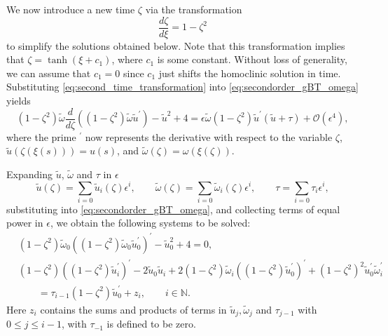 We now introduce a new time $\zeta$ via the transformation
\begin{equation}
  \label{eq:second_time_transformation}
  \frac{d\zeta}{d\xi} = 1 - \zeta^2
\end{equation}
to simplify the solutions obtained below. Note that this transformation implies
that $\zeta = \tanh(\xi + c_1)$, where $c_1$ is some constant. Without loss of
generality, we can assume that $c_1=0$ since $c_1$ just shifts the homoclinic
solution in time. Substituting \cref{eq:second_time_transformation} into
\cref{eq:secondorder_gBT_omega} yields
\begin{equation}
\label{eq:secondorder_gBT_zeta}
(1 - \zeta^2)\tilde\omega\dfrac{d}{d\zeta}\left((1-\zeta^2)\tilde\omega \tilde
u^\prime\right)-\tilde u^2+4
  =\epsilon\tilde\omega (1-\zeta^2)\tilde u^\prime(\tilde u+\tau) +\mathcal{O}(\epsilon^4),
\end{equation}
where the prime ${}^\prime$ now represents the derivative with respect to the
variable $\zeta$, $\tilde u(\zeta(\xi(s))) = u(s)$, and $\tilde \omega
(\zeta) = \omega(\xi(\zeta))$.

Expanding $\tilde u$, $\tilde \omega$ and $\tau$ in $\epsilon$ 
\begin{equation}
  \label{eq:u_tilde_expansion_tau_expansion}
  \tilde u(\zeta) = \sum_{i=0} \tilde u_i(\zeta) \epsilon^i,  \qquad
  \tilde \omega(\zeta) = \sum_{i=0} \tilde \omega_i(\zeta) \epsilon^i,  \qquad
  \tau = \sum_{i=0} \tau_i \epsilon^i,
\end{equation}
substituting into \cref{eq:secondorder_gBT_omega}, and collecting terms of equal
power in $\epsilon$, we obtain the following systems to be solved:
\begin{align}
  &(1-\zeta^2)\tilde\omega_0
    \left((1-\zeta^2)\tilde\omega_0 \tilde u_0^\prime\right)^\prime-\tilde u_0^2 +4 
        {}= 0, \label{eq:0th_order_equation} \\
  &(1-\zeta^2)\left((1-\zeta^2) \tilde u_i^\prime\right)^\prime-2 \tilde u_0
  \tilde u_i   
    + 2 (1 - \zeta^2)\tilde\omega_i \left( (1 - \zeta^2) \tilde u_0^\prime \right)^\prime 
    + (1 - \zeta^2)^2 \tilde u_0^\prime \tilde\omega_i^{\prime}
    \label{eq:ith_order_equation} \\ 
  &\qquad = \tau_{i-1} \left(1- \zeta^2\right) \tilde u_0^\prime 
         + z_i, \qquad i \in \mathbb{N}. \nonumber
\end{align}
Here $z_i$ contains the sums and products of terms in $\tilde u_j,\tilde
\omega_j$ and $\tau_{j-1}$ with $0 \leq j \leq i-1$, with $\tau_{-1}$ is
defined to be zero.

